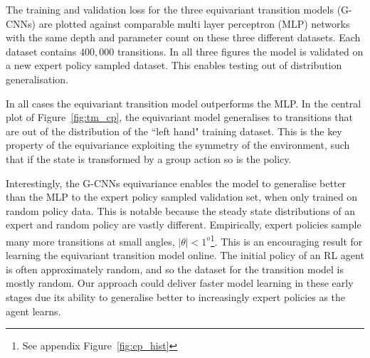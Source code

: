 \documentclass[mlabstract]{jmlr}
\begin{document}
The training and validation loss for the three equivariant transition models (G-CNNs) are plotted against comparable multi layer perceptron (MLP) networks with the same depth and parameter count on these three different datasets. Each dataset contains $400,000$ transitions. In all three figures the model is validated on a new expert policy sampled dataset. This enables testing out of distribution generalisation.

In all cases the equivariant transition model outperforms the MLP. In the central plot of Figure~\ref{fig:tm_cp}, the equivariant model generalises to transitions that are out of the distribution of the ``left hand" training dataset. This is the key property of the equivariance exploiting the symmetry of the environment, such that if the state is transformed by a group action so is the policy.

Interestingly, the G-CNNs equivariance enables the model to generalise better than the MLP to the expert policy sampled validation set, when only trained on random policy data. This is notable because the steady state distributions of an expert and random policy are vastly different. Empirically, expert policies sample many more transitions at small angles, $|\theta| < 1^o$\footnote{See appendix Figure~\ref{fig:cp_hist}}. This is an encouraging result for learning the equivariant transition model online. The initial policy of an RL agent is often approximately random, and so the dataset for the transition model is mostly random. Our approach could deliver faster model learning in these early stages due its ability to generalise better to increasingly expert policies as the agent learns.
\end{document}
